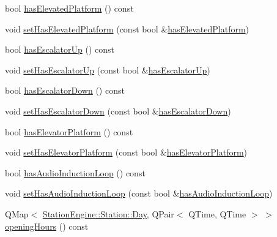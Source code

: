 \begin{DoxyCompactItemize}
\item 
bool \mbox{\hyperlink{classQRail_1_1StationEngine_1_1Station_a406d35e41d5d6aa21d1d6270315b0020}{has\+Elevated\+Platform}} () const
\item 
void \mbox{\hyperlink{classQRail_1_1StationEngine_1_1Station_a3c7125cae3e2524e3ebab483d607c952}{set\+Has\+Elevated\+Platform}} (const bool \&\mbox{\hyperlink{classQRail_1_1StationEngine_1_1Station_a406d35e41d5d6aa21d1d6270315b0020}{has\+Elevated\+Platform}})
\item 
bool \mbox{\hyperlink{classQRail_1_1StationEngine_1_1Station_ab89210b5f7e821c7b426022328d33871}{has\+Escalator\+Up}} () const
\item 
void \mbox{\hyperlink{classQRail_1_1StationEngine_1_1Station_abcd22776685752bf1f2a3cfa0f84bcc0}{set\+Has\+Escalator\+Up}} (const bool \&\mbox{\hyperlink{classQRail_1_1StationEngine_1_1Station_ab89210b5f7e821c7b426022328d33871}{has\+Escalator\+Up}})
\item 
bool \mbox{\hyperlink{classQRail_1_1StationEngine_1_1Station_abc49d1258d3dd4b7b3915c37eec8ce8b}{has\+Escalator\+Down}} () const
\item 
void \mbox{\hyperlink{classQRail_1_1StationEngine_1_1Station_a13d18cc2d7b1ceb4e855c686780f5fe4}{set\+Has\+Escalator\+Down}} (const bool \&\mbox{\hyperlink{classQRail_1_1StationEngine_1_1Station_abc49d1258d3dd4b7b3915c37eec8ce8b}{has\+Escalator\+Down}})
\item 
bool \mbox{\hyperlink{classQRail_1_1StationEngine_1_1Station_ad942fab0cd4c1bd8bac2858b767cbd8d}{has\+Elevator\+Platform}} () const
\item 
void \mbox{\hyperlink{classQRail_1_1StationEngine_1_1Station_a0b35cc4aa9f9ae7dc9503c7ea0919cb1}{set\+Has\+Elevator\+Platform}} (const bool \&\mbox{\hyperlink{classQRail_1_1StationEngine_1_1Station_ad942fab0cd4c1bd8bac2858b767cbd8d}{has\+Elevator\+Platform}})
\item 
bool \mbox{\hyperlink{classQRail_1_1StationEngine_1_1Station_a4f0fe605690b460d88064bd4d36fe1ea}{has\+Audio\+Induction\+Loop}} () const
\item 
void \mbox{\hyperlink{classQRail_1_1StationEngine_1_1Station_a2b37f24a1d97fbb77c0b41c44662e392}{set\+Has\+Audio\+Induction\+Loop}} (const bool \&\mbox{\hyperlink{classQRail_1_1StationEngine_1_1Station_a4f0fe605690b460d88064bd4d36fe1ea}{has\+Audio\+Induction\+Loop}})
\item 
Q\+Map$<$ \mbox{\hyperlink{classQRail_1_1StationEngine_1_1Station_ae8c109a1d5ce2bb41959e62e32392631}{Station\+Engine\+::\+Station\+::\+Day}}, Q\+Pair$<$ Q\+Time, Q\+Time $>$ $>$ \mbox{\hyperlink{classQRail_1_1StationEngine_1_1Station_a952190a3454e31982d35cc3afd7d7d34}{opening\+Hours}} () const

\end{DoxyCompactItemize}
